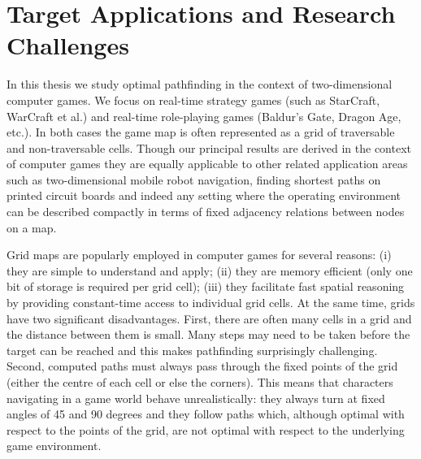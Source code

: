 \section{Target Applications and Research Challenges}
\label{cha::intro::challenges}
In this thesis we study optimal pathfinding in the context of two-dimensional
computer games. We focus on real-time strategy games (such as
StarCraft, WarCraft et al.) and real-time role-playing games (Baldur's Gate,
Dragon Age, etc.). In both cases the game map is often represented as a grid of 
traversable and non-traversable cells. Though our principal results
are derived in the context of computer games they are equally applicable to
other related application areas such as two-dimensional mobile robot navigation,
finding shortest paths on printed circuit boards and indeed any setting where the 
operating environment can be described compactly in terms of fixed adjacency
relations between nodes on a map.


%

Grid maps are popularly employed in computer games for several reasons: 
(i) they are simple to understand and apply; (ii) they are memory efficient (only one bit of storage is required per grid cell); (iii) 
they facilitate fast spatial reasoning by providing constant-time
access to individual grid cells. At the same time, grids have two significant
disadvantages.
First, there are often many cells in a grid and the distance between them is small.
Many steps may need to be taken before the target can be reached and this 
makes pathfinding surprisingly challenging. Second, computed paths must always pass through the fixed points of the grid (either
the centre of each cell or else the corners). 
This means that characters navigating in a game world behave
unrealistically: they always turn at fixed angles of 45 and 90 degrees and
they follow paths which, although optimal with respect to the points of the
grid, are not optimal with respect to the underlying game environment.

